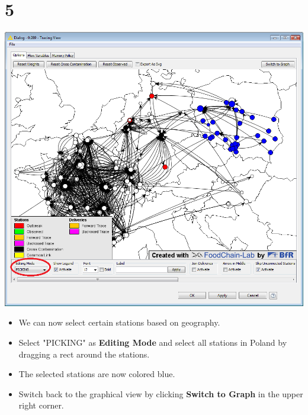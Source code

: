 \documentclass{beamer}
\begin{document}
\section{5}
\begin{frame}
	\begin{center}
  		\includegraphics[height=0.6\textheight]{5.png}
	\end{center}
	\begin{itemize}
		\item We can now select certain stations based on geography.
		\item Select "PICKING" as \textbf{Editing Mode} and select all stations in Poland by dragging a rect around the stations.
		\item The selected stations are now colored blue.
		\item Switch back to the graphical view by clicking \textbf{Switch to Graph} in the upper right corner.
	\end{itemize}
\end{frame}
\end{document}

